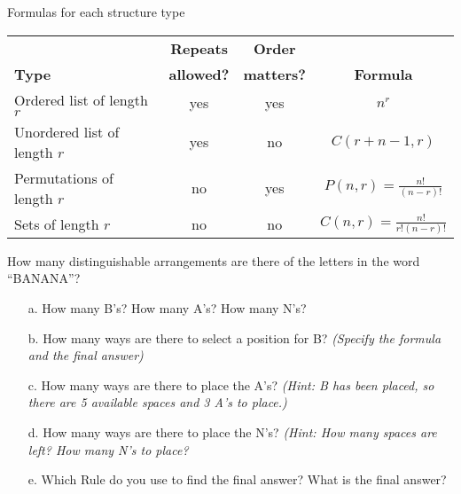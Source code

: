 {    \begin{intro}{Formulas for each structure type}
	
		\begin{center}
			\begin{tabular}{l | c | c | c }
				\textbf{}
					& \textbf{Repeats}
					& \textbf{Order}
					& \textbf{}
				\\
				\textbf{Type}
					& \textbf{allowed?}
					& \textbf{matters?}
					& \textbf{Formula}
				\\ \hline
				Ordered list of length $r$
					& yes
					& yes
					& $n^{r}$

				\\ \hline
				Unordered list of length $r$
					& yes
					& no
					& $C(r + n - 1, r)$
				\\ \hline
				Permutations of length $r$
					& no
					& yes
					& $P(n,r) = \frac{n!}{(n-r)!}$
				\\ \hline
				Sets of length $r$
					& no
					& no
					& $C(n,r) = \frac{n!}{r!(n-r)!}$
			\end{tabular}
		\end{center}
        
    \end{intro}
	
	\newpage
	
    \begin{questionNOGRADE}{\thequestion}
	    How many distinguishable arrangements are there of the letters in the word ``BANANA''?
	    
	    \begin{enumerate}
		    \item[a.]	How many B's?		\tab How many A's?		\tab How many N's?
		    \item[b.]	How many ways are there to select a position for B?
						\textit{(Specify the formula and the final answer)}
			\item[c.]	How many ways are there to place the A's?
						\textit{(Hint: B has been placed, so there are 5 available spaces and 3 A's to place.)}
			\item[d.]	How many ways are there to place the N's?
						\textit{(Hint: How many spaces are left? How many N's to place?}
			\item[e.]	Which Rule do you use to find the final answer? What is the final answer?
		\end{enumerate}
	\end{questionNOGRADE}
	
	\hrulefill
	
}

